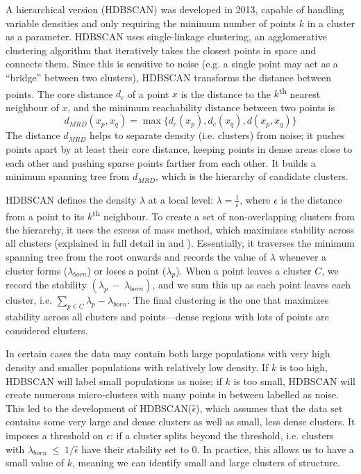A hierarchical version (HDBSCAN) was developed in 2013, capable of handling variable densities and only requiring the minimum number of points $k$ in a cluster as a parameter\citep{campello_density-based_2013}. HDBSCAN uses single-linkage clustering, an agglomerative clustering algorithm that iteratively takes the closest points in space and connects them. Since this is sensitive to noise (e.g. a single point may act as a ``bridge'' between two clusters), HDBSCAN transforms the distance between points. The core distance $d_{c}$ of a point $x$ is the distance to the $k$\textsuperscript{th} nearest neighbour of $x$, and the minimum reachability distance between two points is $$d_{MRD}(x_{p},x_{q}) = \max\{d_{c}(x_{p}), d_{c}(x_{q}), d(x_{p},x_{q})\}$$ The distance $d_{MRD}$ helps to separate density (i.e. clusters) from noise; it pushes points apart by at least their core distance, keeping points in dense areas close to each other and pushing sparse points farther from each other. It builds a minimum spanning tree from $d_{MRD}$, which is the hierarchy of candidate clusters. 

HDBSCAN defines the density $\lambda$ at a local level: $\lambda = \frac{1}{\epsilon}$, where $\epsilon$ is the distance from a point to its $k$\textsuperscript{th} neighbour. To create a set of non-overlapping clusters from the hierarchy, it uses the excess of mass method, which maximizes stability across all clusters (explained in full detail in \citep{mcinnes_accelerated_2017} and \citep{malzer_hybrid_2020}). Essentially, it traverses the minimum spanning tree from the root onwards and records the value of $\lambda$ whenever a cluster forms ($\lambda_{born}$) or loses a point ($\lambda_{p}$). When a point leaves a cluster $C$, we record the stability $(\lambda_{p}~-~\lambda_{born})$, and we sum this up as each point leaves each cluster, i.e. $\sum\limits_{p \in C} \lambda_{p}- \lambda_{born}$. The final clustering is the one that maximizes stability across all clusters and points---dense regions with lots of points are considered clusters.

In certain cases the data may contain both large populations with very high density and smaller populations with relatively low density. If $k$ is too high, HDBSCAN will label small populations as noise; if $k$ is too small, HDBSCAN will create numerous micro-clusters with many points in between labelled as noise. This led to the development of HDBSCAN($\hat{\epsilon}$), which assumes that the data set contains some very large and dense clusters as well as small, less dense clusters\citep{malzer_hybrid_2020}. It imposes a threshold on $\epsilon$: if a cluster splits beyond the threshold, i.e. clusters with $\lambda_{born}~\leq~1/\hat{\epsilon}$ have their stability set to $0$. In practice, this allows us to have a small value of $k$, meaning we can identify small and large clusters of structure.

